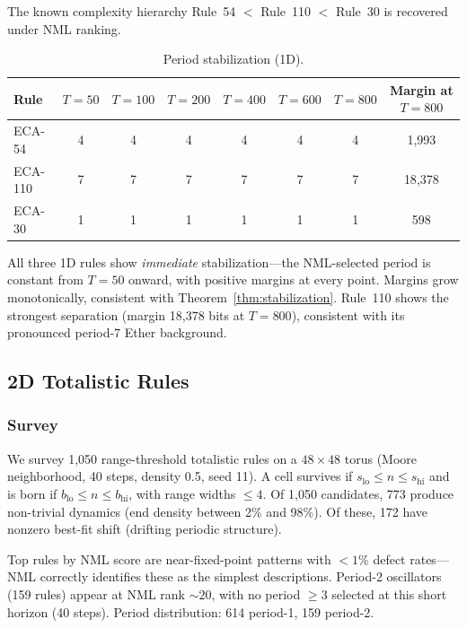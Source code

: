 \documentclass[11pt]{article}
\theoremstyle{definition}
\theoremstyle{remark}
\begin{document}
The known complexity hierarchy Rule~54 $<$ Rule~110 $<$ Rule~30 \cite{crutchfield1997,hanson1992,redeker2017} is recovered under NML ranking.

\begin{table}[h]
\centering
\caption{Period stabilization (1D).}
\begin{tabular}{lccccccc}
\toprule
Rule & $T{=}50$ & $T{=}100$ & $T{=}200$ & $T{=}400$ & $T{=}600$ & $T{=}800$ & Margin at $T{=}800$ \\
\midrule
ECA-54  & 4 & 4 & 4 & 4 & 4 & 4 & 1{,}993 \\
ECA-110 & 7 & 7 & 7 & 7 & 7 & 7 & 18{,}378 \\
ECA-30  & 1 & 1 & 1 & 1 & 1 & 1 & 598 \\
\bottomrule
\end{tabular}
\end{table}

All three 1D rules show \emph{immediate} stabilization---the NML-selected period is constant from $T{=}50$ onward, with positive margins at every point.
Margins grow monotonically, consistent with Theorem~\ref{thm:stabilization}.
Rule~110 shows the strongest separation (margin 18{,}378 bits at $T{=}800$), consistent with its pronounced period-7 Ether background.

\subsection{2D Totalistic Rules}

\subsubsection{Survey}

We survey 1{,}050 range-threshold totalistic rules on a $48 \times 48$ torus (Moore neighborhood, 40 steps, density 0.5, seed 11).
A cell survives if $s_{\text{lo}} \leq n \leq s_{\text{hi}}$ and is born if $b_{\text{lo}} \leq n \leq b_{\text{hi}}$, with range widths $\leq 4$.
Of 1{,}050 candidates, 773 produce non-trivial dynamics (end density between 2\% and 98\%).
Of these, 172 have nonzero best-fit shift (drifting periodic structure).

Top rules by NML score are near-fixed-point patterns with ${<}1\%$ defect rates---NML correctly identifies these as the simplest descriptions.
Period-2 oscillators (159 rules) appear at NML rank ${\sim}20$, with no period ${\geq}3$ selected at this short horizon (40 steps).
Period distribution: 614 period-1, 159 period-2.
\end{document}
